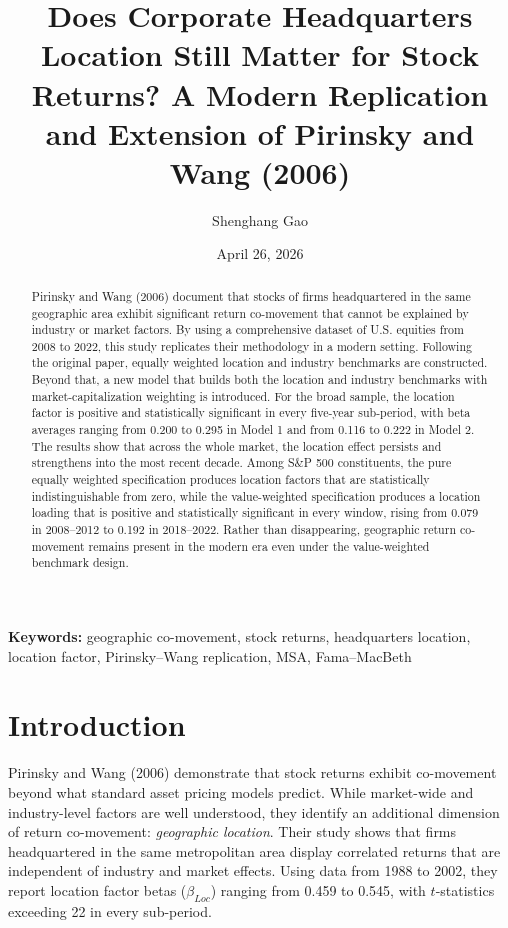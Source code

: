 \documentclass[
  12pt,
]{article}
\title{Does Corporate Headquarters Location Still Matter for Stock
Returns? A Modern Replication and Extension of Pirinsky and Wang (2006)}
\author{Shenghang Gao}
\date{April 26, 2026}
\begin{document}
\maketitle

\begin{abstract}
Pirinsky and Wang (2006) document that stocks of firms headquartered in the same geographic area exhibit significant return co-movement that cannot be explained by industry or market factors. By using a comprehensive dataset of U.S. equities from 2008 to 2022, this study replicates their methodology in a modern setting. Following the original paper, equally weighted location and industry benchmarks are constructed. Beyond that, a new model that builds both the location and industry benchmarks with market-capitalization weighting is introduced. For the broad sample, the location factor is positive and statistically significant in every five-year sub-period, with beta averages ranging from 0.200 to 0.295 in Model 1 and from 0.116 to 0.222 in Model 2. The results show that across the whole market, the location effect persists and strengthens into the most recent decade. Among S\&P 500 constituents, the pure equally weighted specification produces location factors that are statistically indistinguishable from zero, while the value-weighted specification produces a location loading that is positive and statistically significant in every window, rising from 0.079 in 2008--2012 to 0.192 in 2018--2022. Rather than disappearing, geographic return co-movement remains present in the modern era even under the value-weighted benchmark design.
\end{abstract}

\noindent \textbf{Keywords:} geographic co-movement, stock returns,
headquarters location, location factor, Pirinsky--Wang replication, MSA,
Fama--MacBeth

\newpage

\section{Introduction}\label{introduction}

Pirinsky and Wang (2006) demonstrate that stock returns exhibit
co-movement beyond what standard asset pricing models predict. While
market-wide and industry-level factors are well understood, they
identify an additional dimension of return co-movement: \emph{geographic
location}. Their study shows that firms headquartered in the same
metropolitan area display correlated returns that are independent of
industry and market effects. Using data from 1988 to 2002, they report
location factor betas (\(\beta_{Loc}\)) ranging from 0.459 to 0.545,
with \(t\)-statistics exceeding 22 in every sub-period.
\end{document}
